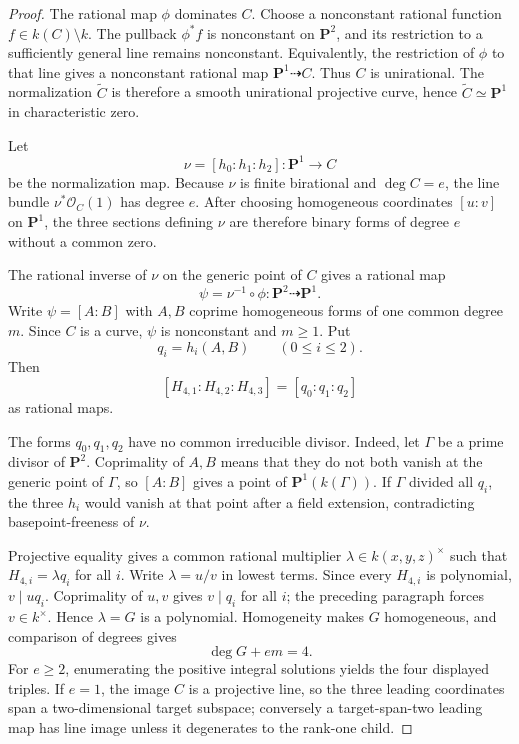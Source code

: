 \begin{proof}
The rational map \(\phi\) dominates \(C\).  Choose a nonconstant
rational function \(f\in k(C)\setminus k\).  The pullback \(\phi^*f\)
is nonconstant on \(\mathbf P^2\), and its restriction to a sufficiently
general line remains nonconstant.  Equivalently, the restriction of
\(\phi\) to that line gives a nonconstant rational map
\(\mathbf P^1\dashrightarrow C\).  Thus \(C\) is unirational.  The
normalization \(\widetilde C\) is therefore a smooth unirational projective
curve, hence \(\widetilde C\simeq\mathbf P^1\) in characteristic zero.

Let
\[
 \nu=[h_0:h_1:h_2]\colon\mathbf P^1\longrightarrow C
\]
be the normalization map.  Because \(\nu\) is finite birational and
\(\deg C=e\), the line bundle \(\nu^*\mathcal O_C(1)\) has degree \(e\).
After choosing homogeneous coordinates \([u:v]\) on \(\mathbf P^1\), the
three sections defining \(\nu\) are therefore binary forms of degree \(e\)
without a common zero.

The rational inverse of \(\nu\) on the generic point of \(C\) gives a
rational map
\[
 \psi=\nu^{-1}\circ\phi\colon\mathbf P^2\dashrightarrow\mathbf P^1.
\]
Write \(\psi=[A:B]\) with \(A,B\) coprime homogeneous forms of one common
degree \(m\).  Since \(C\) is a curve, \(\psi\) is nonconstant and \(m\geq1\).
Put
\[
 q_i=h_i(A,B)\qquad(0\leq i\leq2).
\]
Then
\[
 [H_{4,1}:H_{4,2}:H_{4,3}]=[q_0:q_1:q_2]
\]
as rational maps.

The forms \(q_0,q_1,q_2\) have no common irreducible divisor.  Indeed, let
\(\Gamma\) be a prime divisor of \(\mathbf P^2\).  Coprimality of \(A,B\)
means that they do not both vanish at the generic point of \(\Gamma\), so
\([A:B]\) gives a point of \(\mathbf P^1(k(\Gamma))\).  If \(\Gamma\)
divided all \(q_i\), the three \(h_i\) would vanish at that point after a
field extension, contradicting basepoint-freeness of \(\nu\).

Projective equality gives a common rational multiplier
\(\lambda\in k(x,y,z)^\times\) such that \(H_{4,i}=\lambda q_i\) for all
\(i\).  Write \(\lambda=u/v\) in lowest terms.  Since every \(H_{4,i}\) is
polynomial, \(v\mid u q_i\).  Coprimality of \(u,v\) gives \(v\mid q_i\) for
all \(i\); the preceding paragraph forces \(v\in k^\times\).  Hence
\(\lambda=G\) is a polynomial.  Homogeneity makes \(G\) homogeneous, and
comparison of degrees gives
\[
 \deg G+em=4.
\]
For \(e\geq2\), enumerating the positive integral solutions yields the four
displayed triples.  If \(e=1\), the image \(C\) is a projective line, so the
three leading coordinates span a two-dimensional target subspace; conversely
a target-span-two leading map has line image unless it degenerates to the
rank-one child.
\end{proof}

